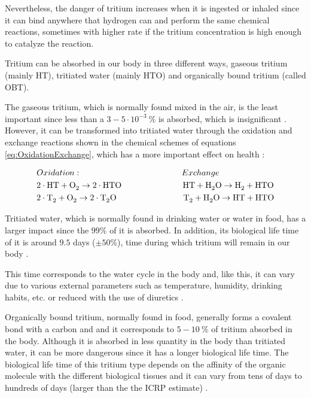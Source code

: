 Nevertheless, the danger of tritium increases when it is ingested or inhaled since it can bind anywhere that hydrogen can and perform the same chemical reactions, sometimes with higher rate if the tritium concentration is high enough to catalyze the reaction. 

Tritium can be absorbed in our body in three different ways, gaseous tritium (mainly HT), tritiated water (mainly HTO) and organically bound tritium (called OBT).

The gaseous tritium, which is normally found mixed in the air, is the least important since less than a $3-5 \cdot{} 10^{-3}~\%$ is absorbed, which is insignificant \cite{TritiumHandling}. However, it can be transformed into tritiated water through the oxidation and exchange reactions shown in the chemical schemes of equations \ref{eq:OxidationExchange}, which has a more important effect on health \cite{TritiumHandling}:

\begin{equation}
\begin{split}
& Oxidation: \qquad \qquad \qquad \qquad \qquad \qquad Exchange\\
& 2\cdot{}\ce{HT} + \ce{O_2} \rightarrow 2 \cdot{} \ce{HTO} ~ \quad \qquad \qquad \qquad \ce{HT} + \ce{H_2 O} \rightarrow \ce{H_2} + \ce{HTO}\\
& 2\cdot{}\ce{T_2} + \ce{O_2} \rightarrow 2 \cdot{} \ce{T_2 O} \qquad \qquad \qquad \qquad \ce{T_2} + \ce{H_2 O} \rightarrow \ce{HT} + \ce{HTO}
\label{eq:OxidationExchange}
\end{split}
\end{equation}

Tritiated water, which is normally found in drinking water or water in food, has a larger impact since the $99\%$ of it is absorbed. In addition, its biological life time of it is around $9.5$ days ($\pm50\%$), time during which tritium will remain in our body \cite{TritiumHandling, FranceTritiumEnvironment, EstimationTritiumDosi}.

This time corresponds to the water cycle in the body and, like this, it can vary due to various external parameters such as temperature, humidity, drinking habits, etc. or reduced with the use of diuretics \cite{TritiumHandling}.

Organically bound tritium, normally found in food, generally forms a covalent bond with a carbon and and it corresponds to $5-10~\%$ of tritium absorbed in the body. Although it is absorbed in less quantity in the body than tritiated water, it can be more dangerous since it has a longer biological life time. The biological life time of this tritium type depends on the affinity of the organic molecule with the different biological tissues and it can vary from tens of days to hundreds of days (larger than the the ICRP estimate) \cite{FranceTritiumEnvironment, EstimationTritiumDosi, EstimationTritiumDosiRats, EstimationTritiumDosiKangarooRats}.

